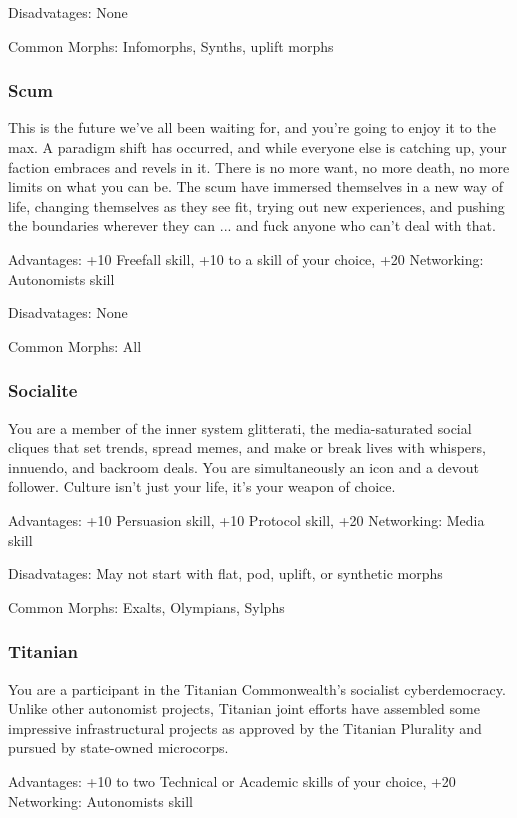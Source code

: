 Disadvatages: None

Common Morphs: Infomorphs, Synths, uplift morphs

\subsubsection{Scum}
\label{sec:scum}

This is the future we’ve all been waiting for, and you’re going to enjoy it to the max. A paradigm shift has occurred, and while everyone else is catching up, your faction embraces and revels in it. There is no more want, no more death, no more limits on what you can be. The scum have immersed themselves in a new way of life, changing themselves as they see fit, trying out new experiences, and pushing the boundaries wherever they can ... and fuck anyone who can’t deal with that.

Advantages: +10 Freefall skill, +10 to a skill of your choice, +20 Networking: Autonomists skill

Disadvatages: None

Common Morphs: All

\subsubsection{Socialite}
\label{sec:socialite}
You are a member of the inner system glitterati, the media-saturated social cliques that set trends, spread memes, and make or break lives with whispers, innuendo, and backroom deals. You are simultaneously an icon and a devout follower. Culture isn’t just your life, it’s your weapon of choice.

Advantages: +10 Persuasion skill, +10 Protocol skill, +20 Networking: Media skill

Disadvatages: May not start with flat, pod, uplift, or synthetic morphs

Common Morphs: Exalts, Olympians, Sylphs

\subsubsection{Titanian}
\label{sec:titanian}

You are a participant in the Titanian Commonwealth’s socialist cyberdemocracy. Unlike other autonomist projects, Titanian joint efforts have assembled some impressive infrastructural projects as approved by the Titanian Plurality and pursued by state-owned microcorps.

Advantages: +10 to two Technical or Academic skills of your choice, +20 Networking: Autonomists skill

